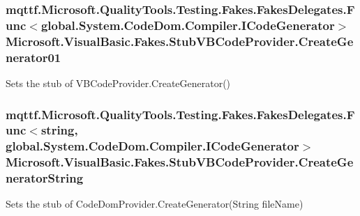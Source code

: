 \hypertarget{class_microsoft_1_1_visual_basic_1_1_fakes_1_1_stub_v_b_code_provider_a7e800fea431216095a95067e5f029153}{
\subsubsection[{Create\-Generator01}]{\setlength{\rightskip}{0pt plus 5cm}mqttf.\-Microsoft.\-Quality\-Tools.\-Testing.\-Fakes.\-Fakes\-Delegates.\-Func$<$global.\-System.\-Code\-Dom.\-Compiler.\-I\-Code\-Generator$>$ Microsoft.\-Visual\-Basic.\-Fakes.\-Stub\-V\-B\-Code\-Provider.\-Create\-Generator01}}\label{class_microsoft_1_1_visual_basic_1_1_fakes_1_1_stub_v_b_code_provider_a7e800fea431216095a95067e5f029153}


Sets the stub of V\-B\-Code\-Provider.\-Create\-Generator()

\hypertarget{class_microsoft_1_1_visual_basic_1_1_fakes_1_1_stub_v_b_code_provider_a715af935403841db178c6e6e03bb9c68}{
\subsubsection[{Create\-Generator\-String}]{\setlength{\rightskip}{0pt plus 5cm}mqttf.\-Microsoft.\-Quality\-Tools.\-Testing.\-Fakes.\-Fakes\-Delegates.\-Func$<$string, global.\-System.\-Code\-Dom.\-Compiler.\-I\-Code\-Generator$>$ Microsoft.\-Visual\-Basic.\-Fakes.\-Stub\-V\-B\-Code\-Provider.\-Create\-Generator\-String}}\label{class_microsoft_1_1_visual_basic_1_1_fakes_1_1_stub_v_b_code_provider_a715af935403841db178c6e6e03bb9c68}


Sets the stub of Code\-Dom\-Provider.\-Create\-Generator(\-String file\-Name)

